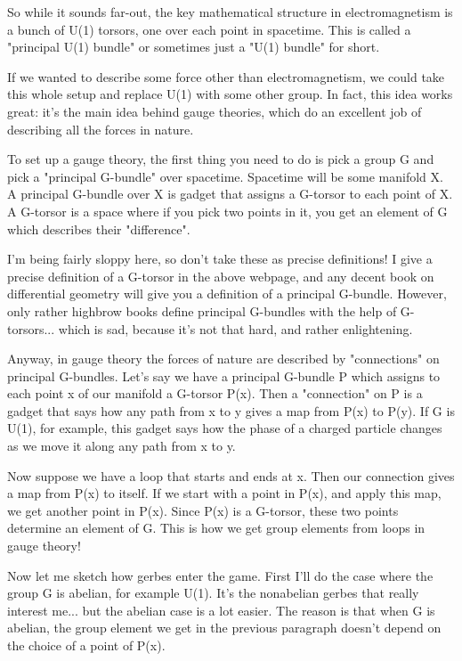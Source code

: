 So while it sounds far-out, the key mathematical structure in
electromagnetism is a bunch of U(1) torsors, one over each point in
spacetime.  This is called a "principal U(1) bundle" or
sometimes just a "U(1) bundle" for short.

If we wanted to describe some force other than electromagnetism, we could
take this whole setup and replace U(1) with some other group.  In fact, 
this idea works great: it's the main idea behind gauge theories, which do 
an excellent job of describing all the forces in nature.  

To set up a gauge theory, the first thing you need to do is pick a 
group G and pick a "principal G-bundle" over spacetime.  Spacetime 
will be some manifold X.  A principal G-bundle over X is gadget that 
assigns a G-torsor to each point of X.  A G-torsor is a space where if 
you pick two points in it, you get an element of G which describes their 
"difference".

I'm being fairly sloppy here, so don't take these as precise definitions!
I give a precise definition of a G-torsor in the above webpage, and any
decent book on differential geometry will give you a definition of a
principal G-bundle.  However, only rather highbrow books define principal
G-bundles with the help of G-torsors... which is sad, because it's not
that hard, and rather enlightening.

Anyway, in gauge theory the forces of nature are described by
"connections" on principal G-bundles.  Let's say we have a
principal G-bundle P which assigns to each point x of our manifold a
G-torsor P(x).  Then a "connection" on P is a gadget that
says how any path from x to y gives a map from P(x) to P(y).  If G is
U(1), for example, this gadget says how the phase of a charged
particle changes as we move it along any path from x to y.

Now suppose we have a loop that starts and ends at x.  Then our connection 
gives a map from P(x) to itself.  If we start with a point in P(x), and 
apply this map, we get another point in P(x).  Since P(x) is a G-torsor, 
these two points determine an element of G.  This is how we get group 
elements from loops in gauge theory!   

Now let me sketch how gerbes enter the game.  First I'll do the case where 
the group G is abelian, for example U(1).  It's the nonabelian gerbes that 
really interest me... but the abelian case is a lot easier.  The reason
is that when G is abelian, the group element we get in the previous 
paragraph doesn't depend on the choice of a point of P(x).  

